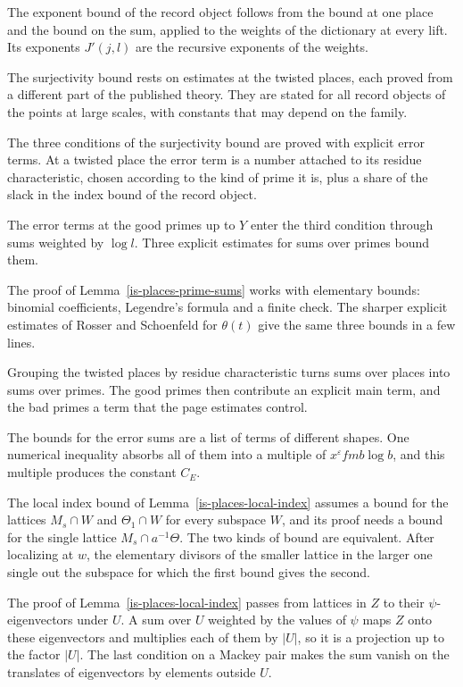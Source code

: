 The exponent bound of the record object follows from the bound at one place and the bound on the sum,
applied to the weights of the dictionary at every lift. Its exponents $J'(j,l)$ are the recursive
exponents of the weights.

The surjectivity bound rests on estimates at the twisted places, each proved from a different part
of the published theory. They are stated for all record objects of the points at large scales, with
constants that may depend on the family.

The three conditions of the surjectivity bound are proved with explicit error terms. At a twisted
place the error term is a number attached to its residue characteristic, chosen according to the
kind of prime it is, plus a share of the slack in the index bound of the record object.

The error terms at the good primes up to $Y$ enter the third condition through sums weighted by
$\log l$. Three explicit estimates for sums over primes bound them.

The proof of Lemma~\ref{is-places-prime-sums} works with elementary bounds: binomial coefficients,
Legendre's formula and a finite check. The sharper explicit estimates of Rosser and Schoenfeld for
$\theta(t)$ give the same three bounds in a few lines.

Grouping the twisted places by residue characteristic turns sums over places into sums over primes.
The good primes then contribute an explicit main term, and the bad primes a term that the page
estimates control.

The bounds for the error sums are a list of terms of different shapes. One numerical inequality
absorbs all of them into a multiple of $x^\varepsilon fmb\log b$, and this multiple produces the
constant $C_E$.

The local index bound of Lemma~\ref{is-places-local-index} assumes a bound for the lattices
$M_s\cap W$ and $\Theta_1\cap W$ for every subspace $W$, and its proof needs a bound for the single
lattice $M_s\cap a^{-1}\Theta$. The two kinds of bound are equivalent. After localizing at $w$, the
elementary divisors of the smaller lattice in the larger one single out the subspace for which the
first bound gives the second.

The proof of Lemma~\ref{is-places-local-index} passes from lattices in $Z$ to their
$\psi$-eigenvectors under $U$. A sum over $U$ weighted by the values of $\psi$ maps $Z$ onto these
eigenvectors and multiplies each of them by $|U|$, so it is a projection up to the factor $|U|$. The
last condition on a Mackey pair makes the sum vanish on the translates of eigenvectors by elements
outside $U$.


